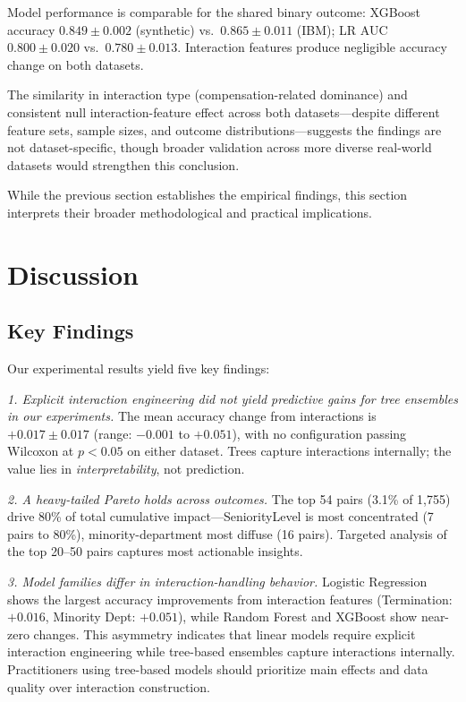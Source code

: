 \documentclass[conference]{IEEEtran}
\begin{document}
Model performance is comparable for the shared binary outcome: XGBoost accuracy $0.849\pm0.002$ (synthetic) vs.\ $0.865\pm0.011$ (IBM); LR AUC $0.800\pm0.020$ vs.\ $0.780\pm0.013$. Interaction features produce negligible accuracy change on both datasets.

The similarity in interaction type (compensation-related dominance) and consistent null interaction-feature effect across both datasets---despite different feature sets, sample sizes, and outcome distributions---suggests the findings are not dataset-specific, though broader validation across more diverse real-world datasets would strengthen this conclusion.

While the previous section establishes the empirical findings, this section interprets their broader methodological and practical implications.

\section{Discussion}
\label{sec:discussion}

\subsection{Key Findings}

Our experimental results yield five key findings:

\textit{1. Explicit interaction engineering did not yield predictive gains for tree ensembles in our experiments.} The mean accuracy change from interactions is $+0.017\pm0.017$ (range: $-0.001$ to $+0.051$), with no configuration passing Wilcoxon at $p<0.05$ on either dataset. Trees capture interactions internally; the value lies in \textit{interpretability}, not prediction.

\textit{2. A heavy-tailed Pareto holds across outcomes.} The top 54 pairs (3.1\% of 1,755) drive 80\% of total cumulative impact---SeniorityLevel is most concentrated (7 pairs to 80\%), minority-department most diffuse (16 pairs). Targeted analysis of the top 20--50 pairs captures most actionable insights.

\textit{3. Model families differ in interaction-handling behavior.} Logistic Regression shows the largest accuracy improvements from interaction features (Termination: $+0.016$, Minority Dept: $+0.051$), while Random Forest and XGBoost show near-zero changes. This asymmetry indicates that linear models require explicit interaction engineering while tree-based ensembles capture interactions internally. Practitioners using tree-based models should prioritize main effects and data quality over interaction construction.
\end{document}
